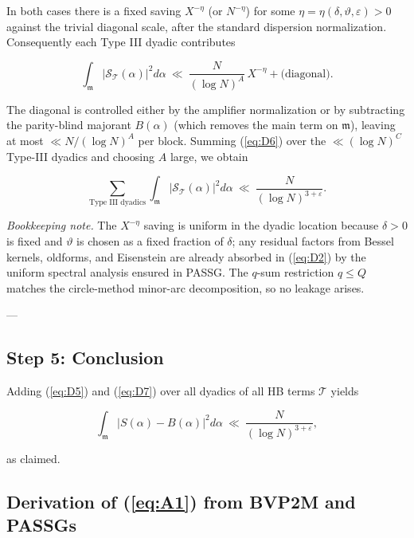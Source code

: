\documentclass[11pt]{article}
\def\eqref#1{(\ref{#1})}%
\theoremstyle{definition}
\theoremstyle{remark}
\numberwithin{equation}{part}
\begin{document}
In both cases there is a fixed saving $X^{-\eta}$ (or $N^{-\eta}$) for some $\eta=\eta(\delta,\vartheta,\varepsilon)>0$ against the trivial diagonal scale, after the standard dispersion normalization. Consequently each Type III dyadic contributes

\begin{equation}\label{eq:D6}\int_{\mathfrak m}\big|\mathcal S_{\mathcal T}(\alpha)\big|^2 d\alpha\ \ll\ \frac{N}{(\log N)^{A}}\,X^{-\eta}+\text{(diagonal)}.\end{equation}

The diagonal is controlled either by the amplifier normalization or by subtracting the parity-blind majorant $B(\alpha)$ (which removes the main term on $\mathfrak m$), leaving at most $\ll N/(\log N)^A$ per block. Summing \eqref{eq:D6} over the $\ll(\log N)^C$ Type-III dyadics and choosing $A$ large, we obtain

\begin{equation}\label{eq:D7}\sum_{\text{Type III dyadics}}\int_{\mathfrak m}\big|\mathcal S_{\mathcal T}(\alpha)\big|^2 d\alpha\ \ll\ \frac{N}{(\log N)^{3+\varepsilon}}.\end{equation}

\emph{Bookkeeping note.} The $X^{-\eta}$ saving is uniform in the dyadic location because $\delta>0$ is fixed and $\vartheta$ is chosen as a fixed fraction of $\delta$; any residual factors from Bessel kernels, oldforms, and Eisenstein are already absorbed in \eqref{eq:D2} by the uniform spectral analysis ensured in PASSG. The $q$-sum restriction $q\le Q$ matches the circle-method minor-arc decomposition, so no leakage arises.

---

\subsection{Step 5: Conclusion}
Adding \eqref{eq:D5} and \eqref{eq:D7} over all dyadics of all HB terms $\mathcal T$ yields

$$
	\int_{\mathfrak m}\big|S(\alpha)-B(\alpha)\big|^2 d\alpha
	\ \ll\ \frac{N}{(\log N)^{3+\varepsilon}},
$$

as claimed.
\subsection{Derivation of \eqref{eq:A1} from BVP2M and PASSGs}
\end{document}
